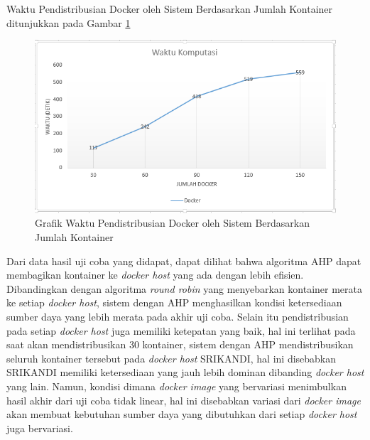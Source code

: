 Waktu Pendistribusian Docker oleh Sistem Berdasarkan Jumlah Kontainer ditunjukkan pada Gambar \ref{Grafik Waktu}
\begin{figure}[H]
        \centering
        \includegraphics[width=\linewidth]{images/bab5/waktu}
        \caption{Grafik Waktu Pendistribusian Docker oleh Sistem Berdasarkan Jumlah Kontainer}
        \label{Grafik Waktu}
      \end{figure} 

	Dari data hasil uji coba yang didapat, dapat dilihat bahwa algoritma AHP dapat membagikan kontainer ke \textit{docker host} yang ada dengan lebih efisien. Dibandingkan dengan algoritma \textit{round robin} yang menyebarkan kontainer merata ke setiap \textit{docker host}, sistem dengan AHP menghasilkan kondisi ketersediaan sumber daya yang lebih merata pada akhir uji coba. Selain itu pendistribusian pada setiap \textit{docker host} juga memiliki ketepatan yang baik, hal ini terlihat pada saat akan mendistribusikan 30 kontainer, sistem dengan AHP mendistribusikan seluruh kontainer tersebut pada \textit{docker host} SRIKANDI, hal ini disebabkan SRIKANDI memiliki ketersediaan yang jauh lebih dominan dibanding \textit{docker host} yang lain.  Namun, kondisi dimana \textit{docker image} yang bervariasi menimbulkan hasil akhir dari uji coba tidak linear, hal ini disebabkan variasi dari \textit{docker image} akan membuat kebutuhan sumber daya yang dibutuhkan dari setiap \textit{docker host} juga bervariasi.
